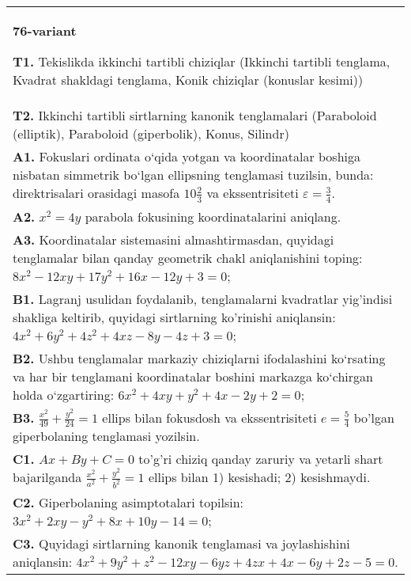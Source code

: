 \documentclass{article}
\begin{document}
\begin{tabular}{m{17cm}}
\textbf{76-variant}
\newline

\textbf{T1.} Tekislikda ikkinchi tartibli chiziqlar (Ikkinchi tartibli tenglama, Kvadrat shakldagi tenglama, Konik chiziqlar (konuslar kesimi)) \\
\textbf{T2.} Ikkinchi tartibli sirtlarning kanonik tenglamalari (Paraboloid (elliptik), Paraboloid (giperbolik), Konus, Silindr) \\
\textbf{A1.} Fokuslari ordinata o‘qida yotgan va koordinatalar boshiga nisbatan simmetrik bo‘lgan ellipsning tenglamasi tuzilsin, bunda: direktrisalari orasidagi masofa $10 \frac{2}{3}$ va ekssentrisiteti $\varepsilon=\frac{3}{4}$. \\
\textbf{A2.} $x^2=4 y$ parabola fokusining koordinatalarini aniqlang. \\
\textbf{A3.} Koordinatalar sistemasini almashtirmasdan, quyidagi tenglamalar bilan qanday geometrik chakl aniqlanishini toping: $8 x^2-12 x y+17 y^2+16 x-12 y+3=0$; \\
\textbf{B1.} Lagranj usulidan foydalanib, tenglamalarni kvadratlar yig'indisi shakliga keltirib, quyidagi sirtlarning ko'rinishi aniqlansin: $4 x^2+6 y^2+4 z^2+4 x z-8 y-4 z+3=0$; \\
\textbf{B2.} Ushbu tenglamalar markaziy chiziqlarni ifodalashini ko‘rsating va har bir tenglamani koordinatalar boshini markazga ko‘chirgan holda o‘zgartiring: $6 x^2+4 x y+y^2+4 x-2 y+2=0$; \\
\textbf{B3.} $\frac{x^2}{49}+\frac{y^2}{24}=1$ ellips bilan fokusdosh va ekssentrisiteti $e=\frac{5}{4}$ bo'lgan giperbolaning tenglamasi yozilsin. \\
\textbf{C1.} $A x+B y+C=0$ to'g'ri chiziq qanday zaruriy va yetarli shart bajarilganda $\frac{x^2}{a^2}+\frac{y^2}{b^2}=1$ ellips bilan 1) kesishadi; 2) kesishmaydi. \\
\textbf{C2.} Giperbolaning asimptotalari topilsin: $3 x^2+2 x y-y^2+8 x+10 y-14=0$; \\
\textbf{C3.} Quyidagi sirtlarning kanonik tenglamasi va joylashishini aniqlansin: $4 x^2+9 y^2+z^2-12 x y-6 y z+4 z x+4 x-6 y+2 z-5=0$. \\

\end{tabular}
\vspace{1cm}
\end{document}
